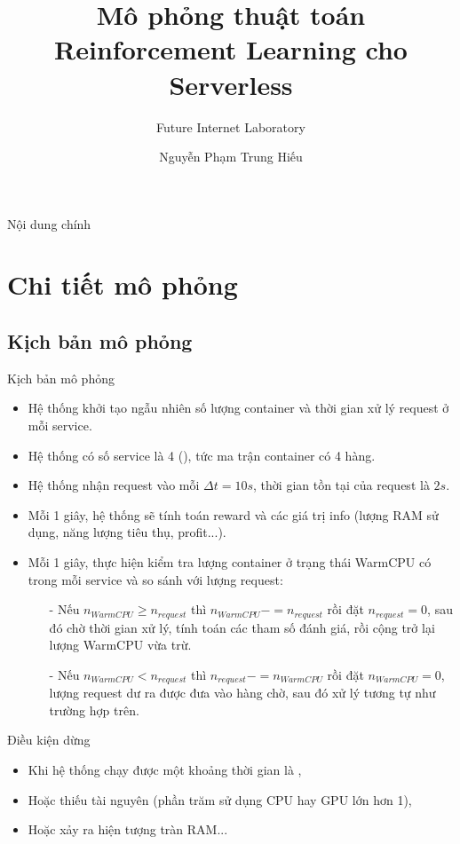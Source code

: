 \documentclass[10pt,aspectratio=169]{beamer}
\title{Mô phỏng thuật toán Reinforcement Learning cho Serverless}
\subtitle{Future Internet Laboratory}
\author{Nguyễn Phạm Trung Hiếu}
\begin{document}
\maketitle

\begingroup
    \begin{frame}{Nội dung chính}{}
        \tableofcontents
    \end{frame}
\endgroup

\section{Chi tiết mô phỏng}

\subsection{Kịch bản mô phỏng}

\begin{frame}{Kịch bản mô phỏng}
\begin{itemize}
\setlength\itemsep{8pt}
\item Hệ thống khởi tạo ngẫu nhiên số lượng container và thời gian xử lý request ở mỗi service.
\item Hệ thống có số service là 4 (), tức ma trận container có 4 hàng.
\item Hệ thống nhận request vào mỗi $ \Delta t = 10s $, thời gian tồn tại của request là $ 2s $.
\item Mỗi 1 giây, hệ thống sẽ tính toán reward và các giá trị info (lượng RAM sử dụng, năng lượng tiêu thụ, profit...).
\item Mỗi 1 giây, thực hiện kiểm tra lượng container ở trạng thái WarmCPU có trong mỗi service và so sánh với lượng request:
\begin{itemize}
\setlength\itemsep{4pt}
\item[-] Nếu $ n_{WarmCPU} \geq n_{request} $ thì $ n_{WarmCPU} -= n_{request} $ rồi đặt $ n_{request} = 0 $, sau đó chờ thời gian xử lý, tính toán các tham số đánh giá, rồi cộng trở lại lượng WarmCPU vừa trừ.
\item[-] Nếu $ n_{WarmCPU} < n_{request} $ thì $ n_{request} -= n_{WarmCPU} $ rồi đặt $ n_{WarmCPU} = 0 $, lượng request dư ra được đưa vào hàng chờ, sau đó xử lý tương tự như trường hợp trên.
\end{itemize}
\end{itemize}
\end{frame}

\begin{frame}{Điều kiện dừng}{\subsecname}
\begin{itemize}
\setlength\itemsep{8pt}
\item Khi hệ thống chạy được một khoảng thời gian là ,
\item Hoặc thiếu tài nguyên (phần trăm sử dụng CPU hay GPU lớn hơn 1),
\item Hoặc xảy ra hiện tượng tràn RAM...
\end{itemize}
\end{frame}
\end{document}
